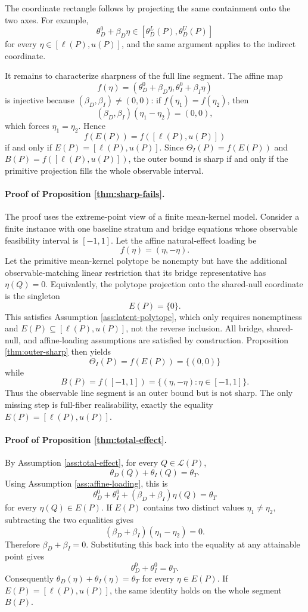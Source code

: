 \documentclass[11pt]{article}
\theoremstyle{definition}
\theoremstyle{plain}
\theoremstyle{remark}
\begin{document}
The coordinate rectangle follows by projecting the same containment onto the
two axes.  For example,
\[
  \theta_D^0+\beta_D\eta\in
  [\theta_D^L(P),\theta_D^U(P)]
\]
for every \(\eta\in[\ell(P),u(P)]\), and the same argument applies to the
indirect coordinate.

It remains to characterize sharpness of the full line segment.  The affine map
\[
  f(\eta)=(\theta_D^0+\beta_D\eta,\theta_I^0+\beta_I\eta)
\]
is injective because \((\beta_D,\beta_I)\ne(0,0)\): if
\(f(\eta_1)=f(\eta_2)\), then
\[
  (\beta_D,\beta_I)(\eta_1-\eta_2)=(0,0),
\]
which forces \(\eta_1=\eta_2\).  Hence
\[
  f(E(P))=f([\ell(P),u(P)])
\]
if and only if \(E(P)=[\ell(P),u(P)]\).  Since
\(\Theta_I(P)=f(E(P))\) and \(B(P)=f([\ell(P),u(P)])\), the outer bound is sharp
if and only if the primitive projection fills the whole observable interval.

\paragraph{Proof of Proposition \ref{thm:sharp-fails}.}
The proof uses the extreme-point view of a finite mean-kernel model.  Consider
a finite instance with one baseline stratum and bridge equations whose
observable feasibility interval is \([-1,1]\).  Let the affine natural-effect
loading be
\[
  f(\eta)=(\eta,-\eta).
\]
Let the primitive mean-kernel polytope be nonempty but have the additional
observable-matching linear restriction that its bridge representative has
\(\eta(Q)=0\).  Equivalently, the polytope projection onto the shared-null
coordinate is the singleton
\[
  E(P)=\{0\}.
\]
This satisfies Assumption \ref{ass:latent-polytope}, which only requires
nonemptiness and \(E(P)\subseteq[\ell(P),u(P)]\), not the reverse inclusion.
All bridge, shared-null, and affine-loading assumptions are satisfied by
construction.  Proposition \ref{thm:outer-sharp} then yields
\[
  \Theta_I(P)=f(E(P))=\{(0,0)\}
\]
while
\[
  B(P)=f([-1,1])=\{(\eta,-\eta):\eta\in[-1,1]\}.
\]
Thus the observable line segment is an outer bound but is not sharp.  The only
missing step is full-fiber realisability, exactly the equality
\(E(P)=[\ell(P),u(P)]\).

\paragraph{Proof of Proposition \ref{thm:total-effect}.}
By Assumption \ref{ass:total-effect}, for every \(Q\in\mathcal L(P)\),
\[
  \theta_D(Q)+\theta_I(Q)=\theta_T.
\]
Using Assumption \ref{ass:affine-loading}, this is
\[
  \theta_D^0+\theta_I^0+(\beta_D+\beta_I)\eta(Q)=\theta_T
\]
for every \(\eta(Q)\in E(P)\).  If \(E(P)\) contains two distinct values
\(\eta_1\ne\eta_2\), subtracting the two equalities gives
\[
  (\beta_D+\beta_I)(\eta_1-\eta_2)=0.
\]
Therefore \(\beta_D+\beta_I=0\).  Substituting this back into the equality at
any attainable point gives
\[
  \theta_D^0+\theta_I^0=\theta_T.
\]
Consequently \(\theta_D(\eta)+\theta_I(\eta)=\theta_T\) for every
\(\eta\in E(P)\).  If \(E(P)=[\ell(P),u(P)]\), the same identity holds on the
whole segment \(B(P)\).
\end{document}

